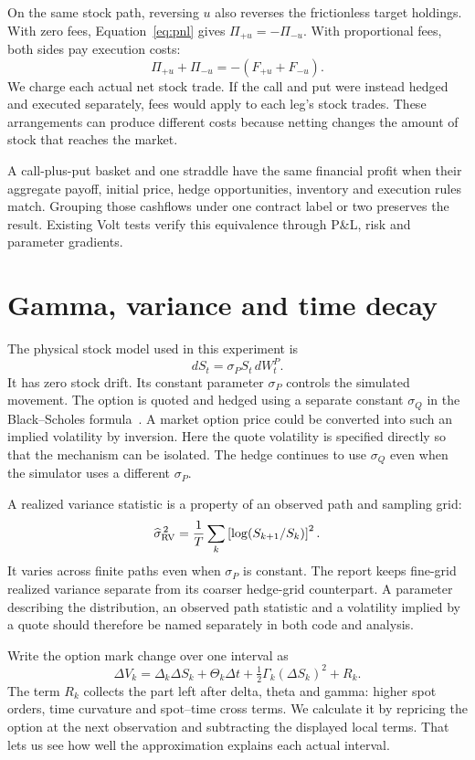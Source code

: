 \documentclass[8pt]{strategynet-journal}
\newcommand{\VOLT}{\textsf{Volt}}
\begin{document}
\begin{SNcolumns}
On the same stock path, reversing $u $ also reverses the frictionless target
holdings. With zero fees, Equation~\eqref{eq:pnl} gives
$\Pi_{+u}=-\Pi_{-u}$. With proportional fees, both sides pay execution costs:
\[
 \Pi_{+u}+\Pi_{-u}=-(F_{+u}+F_{-u}).
\]
We charge each actual net stock trade. If the call and put were instead hedged
and executed separately, fees would apply to each leg's stock trades. These
arrangements can produce different costs because netting changes the amount
of stock that reaches the market.

A call-plus-put basket and one straddle
have the same financial profit when their aggregate payoff, initial price,
hedge opportunities, inventory and execution rules match. Grouping those cashflows under one contract label or two preserves the result. Existing
\VOLT{} tests verify this equivalence through P\&L, risk and parameter gradients.

\section{Gamma, variance and time decay}
The physical stock model used in this experiment is
\begin{equation}
 dS_t=\sigma_P S_t\, dW_t^P.
 \label{eq:physical}
\end{equation}
It has zero stock drift. Its constant parameter $\sigma_P $ controls the
simulated movement. The option is quoted and hedged using a separate constant
$\sigma_Q $ in the Black--Scholes formula~\cite{blackscholes}. A market option
price could be converted into such an implied volatility by inversion. Here
the quote volatility is specified directly so that the mechanism can be
isolated. The hedge continues to use $\sigma_Q $ even when the simulator uses a
different $\sigma_P $.

A realized variance statistic is a property of an observed path and sampling
grid:
\[
 \widehat{\sigma}_{\rm RV}^{\, 2}=\frac 1T
 \sum_k\left[\log(S_{k+1}/S_k)\right]^2.
\]
It varies across finite paths even when $\sigma_P $ is constant. The report keeps
fine-grid realized variance separate from its coarser hedge-grid counterpart.
A parameter describing the distribution, an observed path statistic and a
volatility implied by a quote should therefore be named separately in both
code and analysis.

Write the option mark change over one interval as
\begin{equation}
 \Delta V_k=\Delta_k\Delta S_k+\Theta_k\Delta t
       +\tfrac 12\Gamma_k(\Delta S_k)^2+R_k.
 \label{eq:taylor}
\end{equation}
The term $R_k$ collects the part left after delta, theta and gamma: higher spot
orders, time curvature and spot--time cross terms. We calculate it by repricing
the option at the next observation and subtracting the displayed local terms.
That lets us see how well the approximation explains each actual interval.


\end{SNcolumns}
\end{document}
